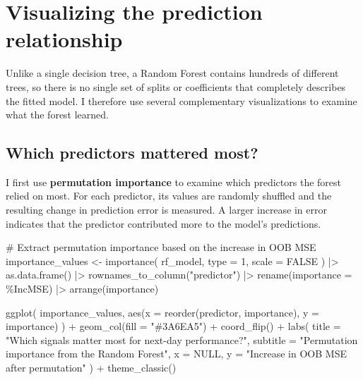 \documentclass[
  letterpaper,
  DIV=11,
  numbers=noendperiod]{scrreprt}
\newenvironment{Shaded}{\begin{snugshade}}{\end{snugshade}}
\newcommand{\AttributeTok}[1]{\textcolor[rgb]{0.40,0.45,0.13}{#1}}
\newcommand{\CommentTok}[1]{\textcolor[rgb]{0.37,0.37,0.37}{#1}}
\newcommand{\ConstantTok}[1]{\textcolor[rgb]{0.56,0.35,0.01}{#1}}
\newcommand{\DecValTok}[1]{\textcolor[rgb]{0.68,0.00,0.00}{#1}}
\newcommand{\FunctionTok}[1]{\textcolor[rgb]{0.28,0.35,0.67}{#1}}
\newcommand{\NormalTok}[1]{\textcolor[rgb]{0.00,0.23,0.31}{#1}}
\newcommand{\OtherTok}[1]{\textcolor[rgb]{0.00,0.23,0.31}{#1}}
\newcommand{\SpecialCharTok}[1]{\textcolor[rgb]{0.37,0.37,0.37}{#1}}
\newcommand{\StringTok}[1]{\textcolor[rgb]{0.13,0.47,0.30}{#1}}
\begin{document}
\section{Visualizing the prediction
relationship}\label{visualizing-the-prediction-relationship}

Unlike a single decision tree, a Random Forest contains hundreds of
different trees, so there is no single set of splits or coefficients
that completely describes the fitted model. I therefore use several
complementary visualizations to examine what the forest learned.

\subsection{Which predictors mattered
most?}\label{which-predictors-mattered-most}

I first use \textbf{permutation importance} to examine which predictors
the forest relied on most. For each predictor, its values are randomly
shuffled and the resulting change in prediction error is measured. A
larger increase in error indicates that the predictor contributed more
to the model's predictions.

\begin{Shaded}
\begin{Highlighting}[]
\CommentTok{\# Extract permutation importance based on the increase in OOB MSE}
\NormalTok{importance\_values }\OtherTok{\textless{}{-}} \FunctionTok{importance}\NormalTok{(}
\NormalTok{  rf\_model,}
  \AttributeTok{type =} \DecValTok{1}\NormalTok{,}
  \AttributeTok{scale =} \ConstantTok{FALSE}
\NormalTok{) }\SpecialCharTok{|\textgreater{}}
  \FunctionTok{as.data.frame}\NormalTok{() }\SpecialCharTok{|\textgreater{}}
  \FunctionTok{rownames\_to\_column}\NormalTok{(}\StringTok{"predictor"}\NormalTok{) }\SpecialCharTok{|\textgreater{}}
  \FunctionTok{rename}\NormalTok{(}\AttributeTok{importance =} \StringTok{\textasciigrave{}}\AttributeTok{\%IncMSE}\StringTok{\textasciigrave{}}\NormalTok{) }\SpecialCharTok{|\textgreater{}}
  \FunctionTok{arrange}\NormalTok{(importance)}

\FunctionTok{ggplot}\NormalTok{(}
\NormalTok{  importance\_values,}
  \FunctionTok{aes}\NormalTok{(}\AttributeTok{x =} \FunctionTok{reorder}\NormalTok{(predictor, importance), }\AttributeTok{y =}\NormalTok{ importance)}
\NormalTok{) }\SpecialCharTok{+}
  \FunctionTok{geom\_col}\NormalTok{(}\AttributeTok{fill =} \StringTok{"\#3A6EA5"}\NormalTok{) }\SpecialCharTok{+}
  \FunctionTok{coord\_flip}\NormalTok{() }\SpecialCharTok{+}
  \FunctionTok{labs}\NormalTok{(}
    \AttributeTok{title =} \StringTok{"Which signals matter most for next{-}day performance?"}\NormalTok{,}
    \AttributeTok{subtitle =} \StringTok{"Permutation importance from the Random Forest"}\NormalTok{,}
    \AttributeTok{x =} \ConstantTok{NULL}\NormalTok{,}
    \AttributeTok{y =} \StringTok{"Increase in OOB MSE after permutation"}
\NormalTok{  ) }\SpecialCharTok{+}
  \FunctionTok{theme\_classic}\NormalTok{()}
\end{Highlighting}
\end{Shaded}
\end{document}
